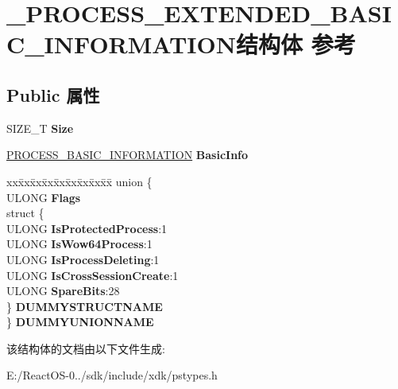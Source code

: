 \hypertarget{struct___p_r_o_c_e_s_s___e_x_t_e_n_d_e_d___b_a_s_i_c___i_n_f_o_r_m_a_t_i_o_n}{}\section{\+\_\+\+P\+R\+O\+C\+E\+S\+S\+\_\+\+E\+X\+T\+E\+N\+D\+E\+D\+\_\+\+B\+A\+S\+I\+C\+\_\+\+I\+N\+F\+O\+R\+M\+A\+T\+I\+O\+N结构体 参考}
\label{struct___p_r_o_c_e_s_s___e_x_t_e_n_d_e_d___b_a_s_i_c___i_n_f_o_r_m_a_t_i_o_n}
\subsection*{Public 属性}
\begin{DoxyCompactItemize}
\item 
\mbox{\label{struct___p_r_o_c_e_s_s___e_x_t_e_n_d_e_d___b_a_s_i_c___i_n_f_o_r_m_a_t_i_o_n_aafbdb3c6346a5cc013108742c36300c9}} 
S\+I\+Z\+E\+\_\+T {\bfseries Size}
\item 
\mbox{\label{struct___p_r_o_c_e_s_s___e_x_t_e_n_d_e_d___b_a_s_i_c___i_n_f_o_r_m_a_t_i_o_n_a9c10cfd9bbf22d550ee7744e0c1d70a6}} 
\hyperlink{struct___p_r_o_c_e_s_s___b_a_s_i_c___i_n_f_o_r_m_a_t_i_o_n}{P\+R\+O\+C\+E\+S\+S\+\_\+\+B\+A\+S\+I\+C\+\_\+\+I\+N\+F\+O\+R\+M\+A\+T\+I\+ON} {\bfseries Basic\+Info}
\item 
\mbox{\label{struct___p_r_o_c_e_s_s___e_x_t_e_n_d_e_d___b_a_s_i_c___i_n_f_o_r_m_a_t_i_o_n_a4c2c82afcf5b0d45451882875b6565c3}} 
\begin{tabbing}
xx\=xx\=xx\=xx\=xx\=xx\=xx\=xx\=xx\=\kill
union \{\\
\>ULONG {\bfseries Flags}\\
\>struct \{\\
\>\>ULONG {\bfseries IsProtectedProcess}:1\\
\>\>ULONG {\bfseries IsWow64Process}:1\\
\>\>ULONG {\bfseries IsProcessDeleting}:1\\
\>\>ULONG {\bfseries IsCrossSessionCreate}:1\\
\>\>ULONG {\bfseries SpareBits}:28\\
\>\} {\bfseries DUMMYSTRUCTNAME}\\
\} {\bfseries DUMMYUNIONNAME}\\

\end{tabbing}\end{DoxyCompactItemize}


该结构体的文档由以下文件生成\+:\begin{DoxyCompactItemize}
\item 
E\+:/\+React\+O\+S-\/0../sdk/include/xdk/pstypes.\+h\end{DoxyCompactItemize}
